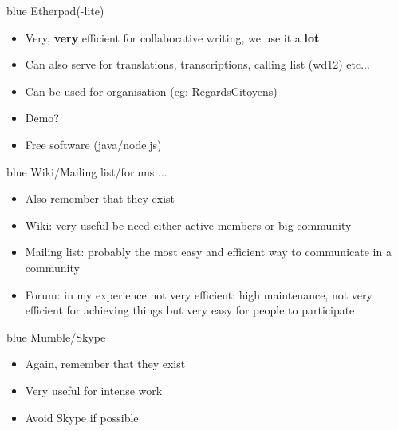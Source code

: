 \documentclass{beamer}
\begin{document}
\begin{frame}[fragile]{}
\begin{LARGE}
\begin{color}{blue}
Etherpad(-lite)
\end{color}
\end{LARGE}
\vspace{3mm}
\begin{itemize}
    \item Very, \textbf{very} efficient for collaborative writing, we use it a \textbf{lot}
    \item Can also serve for translations, transcriptions, calling list (wd12) etc...
    \item Can be used for organisation (eg: RegardsCitoyens)
    \item Demo?
    \item Free software (java/node.js)
\end{itemize}
\end{frame}

\begin{frame}[fragile]{}
\begin{LARGE}
\begin{color}{blue}
    Wiki/Mailing list/forums ...
\end{color}
\end{LARGE}
\vspace{3mm}
\begin{itemize}
    \item Also remember that they exist
    \item Wiki: very useful be need either active members or big community
    \item Mailing list: probably the most easy and efficient way to communicate in a community
    \item Forum: in my experience not very efficient: high maintenance, not very efficient for achieving things but very easy for people to participate
\end{itemize}
\end{frame}

\begin{frame}[fragile]{}
\begin{LARGE}
\begin{color}{blue}
    Mumble/Skype
\end{color}
\end{LARGE}
\vspace{3mm}
\begin{itemize}
    \item Again, remember that they exist
    \item Very useful for intense work
    \item Avoid Skype if possible
\end{itemize}
\end{frame}
\end{document}
